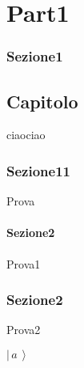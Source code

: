 \documentclass[border=10pt]{book}
\newcommand{\ket}[1]{\ensuremath{\left|\,#1\,\right\rangle}}
\begin{document}
\part{Part1}

\section{Sezione1}

\chapter{Capitolo}
ciaociao
\section{Sezione11}
Prova
\subsection{Sezione2}
Prova1

\section{Sezione2}
Prova2

$\ket{a}$
\end{document}
